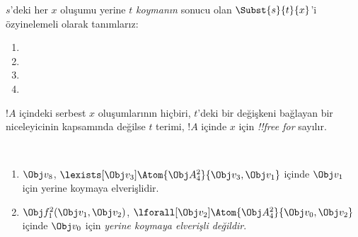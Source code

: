 \documentclass[../../../include/open-logic-section]{subfiles}
\begin{document}


\begin{defn}
$s$'deki her $x$ oluşumu yerine $t$ \emph{koymanın} sonucu olan
$\Subst{s}{t}{x}$'i özyinelemeli olarak tanımlarız:
\begin{enumerate}
\item {}

\item {}

\item {}

\item{}
\end{enumerate}
\end{defn}

\begin{defn}
$!A$ içindeki serbest $x$ oluşumlarının hiçbiri, $t$'deki bir değişkeni
bağlayan bir niceleyicinin kapsamında değilse $t$ terimi, $!A$ içinde
$x$ için \emph{!!{free for}} sayılır.
\end{defn}

\begin{ex} ~
\begin{enumerate}
\item $\Obj v_8$, $\lexists[\Obj
  v_3]\Atom{\Obj A^2_4}{\Obj v_3,\Obj v_1}$ içinde $\Obj v_1$ için yerine
  koymaya elverişlidir.

\item $\Obj f^2_1(\Obj v_1, \Obj v_2)$, $\lforall[\Obj
  v_2]\Atom{\Obj A^2_4}{\Obj v_0,\Obj v_2}$ içinde $\Obj v_0$ için
  \emph{yerine koymaya elverişli değildir}.
\end{enumerate}
\end{ex}
\end{document}
